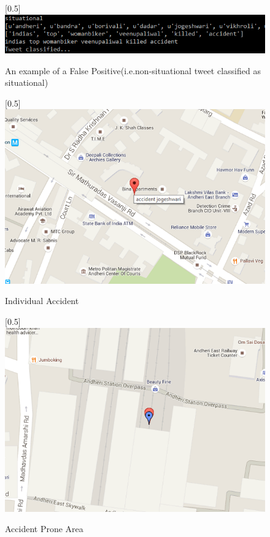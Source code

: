 \documentclass[journal]{IEEEtran}
\begin{document}
\begin{center}
	\begin{figure}[H]
		\scalebox{0.5}[0.5]{\includegraphics{FalsePositive}}
		\caption{An example of a False Positive(i.e.non-situational tweet classified as situational)}
		\label{FalsePositive}
	\end{figure}
\end{center}
\begin{center}
	\begin{figure}[H]
		\scalebox{0.5}[0.5]{\includegraphics{IndividualAccident}}
		\caption{Individual Accident}
		\label{IndividualAccident}
	\end{figure}
\end{center}
\begin{center}
	\begin{figure}[H]
		\scalebox{0.5}[0.5]{\includegraphics{AccidentProne}}
		\caption{Accident Prone Area}
		\label{AccidentProne}
	\end{figure}
\end{center}
\end{document}
